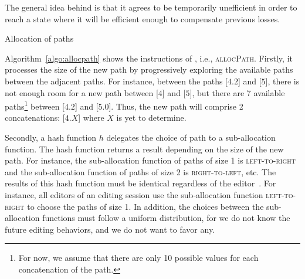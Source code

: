 \noindent The general idea behind \LSEQ is that it agrees to be temporarily
unefficient in order to reach a state where it will be efficient enough to
compensate previous losses.


\begin{algorithm}

\caption{\label{algo:allocpath}Allocation of paths}
\end{algorithm}

Algorithm~\ref{algo:allocpath} shows the instructions of \LSEQ, i.e.,
\textsc{allocPath}. Firstly, it processes the size of the new path by
progressively exploring the available paths between the adjacent paths. For
instance, between the paths [$4.2$] and [$5$], there is not enough room for a
new path between [$4$] and [$5$], but there are 7 available paths\footnote{For
  now, we assume that there are only 10 possible values for each concatenation
  of the path.} between [$4.2$] and [$5.0$]. Thus, the new path will comprise 2
concatenations: [$4.X$] where $X$ is yet to determine.

\noindent Secondly, a hash function $h$ delegates the choice of path to a
sub-allocation function. The hash function returns a result depending on the
size of the new path. For instance, the sub-allocation function of paths of size
1 is \textsc{left-to-right} and the sub-allocation function of paths of size 2
is \textsc{right-to-left}, etc. The results of this hash function must be
identical regardless of the editor~\cite{nedelec2013concurrency}. For instance,
all editors of an editing session use the sub-allocation function
\textsc{left-to-right} to choose the paths of size 1. In addition, the choices
between the sub-allocation functions must follow a uniform distribution, for we
do not know the future editing behaviors, and we do not want to favor any.




